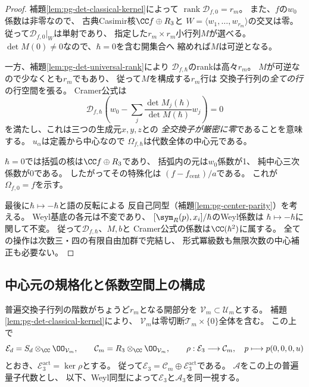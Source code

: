 \begin{proof}
補題\ref{lem:pg-det-classical-kernel}によって
$\operatorname{rank}\mathcal D_{f,0}=r_m$。
また、$f$の$w_0$係数は非零なので、
古典Casimir核$\CC f\oplus R_3$と
$W=\langle w_1,\ldots,w_{r_m}\rangle$の交叉は零。
従って$\mathcal D_{f,0}|_W$は単射であり、
指定した$r_m\times r_m$小行列$M$が選べる。
$\det M(0)\ne0$なので、$\hbar=0$を含む開集合へ
縮めれば$M$は可逆となる。

一方、補題\ref{lem:pg-det-universal-rank}により
$\mathcal D_{f,\hbar}$のrankは高々$r_m$。
$M$が可逆なので少なくとも$r_m$でもあり、
従って$M$を構成する$r_m$行は
交換子行列の\emph{全ての行}の行空間を張る。
Cramer公式は
\begin{equation}
 \mathcal D_{f,\hbar}
 \left(w_0-\sum_j\frac{\det M_j(\hbar)}{\det M(\hbar)}w_j\right)=0
 \label{eq:pg-det-cramer-kernel}
\end{equation}
を満たし、これは三つの生成元$x,y,z$との
\emph{全交換子が厳密に零}であることを意味する。
$u_\alpha$は定義から中心なので
$\Omega_{f,\hbar}$は代数全体の中心元である。

$\hbar=0$では括弧の核は$\CC f\oplus R_3$であり、
括弧内の元は$w_0$係数が1、
純中心三次係数が0である。
したがってその特殊化は
$(f-f_{\mathrm{cent}})/a$である。
これが$\Omega_{f,0}=f$を示す。

最後に$\hbar\mapsto-\hbar$と語の反転による
反自己同型（補題\ref{lem:pg-center-parity}）を考える。
Weyl基底の各元は不変であり、
$[\sym_R(p),x_i]/\hbar$のWeyl係数は
$\hbar\mapsto-\hbar$に関して不変。
従って$\mathcal D_{f,\hbar}$、$M,b$と
Cramer公式の係数は$\CC(\hbar^2)$に属する。
全ての操作は次数三・四の有限自由加群で完結し、
形式冪級数も無限次数の中心補正も必要ない。
\end{proof}

\subsection{中心元の規格化と係数空間上の構成}
\label{subsec:pg-det-center-family}
普遍交換子行列の階数がちょうど$r_m$となる開部分を
$\mathcal V_m\subset\mathcal U_m$とする。
補題\ref{lem:pg-det-classical-kernel}により、
$\mathcal V_m$は零切断$\mathcal T_m\times\{0\}$全体を含む。
この上で
\begin{equation}
 \mathcal E_d=S_d\otimes_\CC\OO_{\mathcal V_m},\qquad
 \mathcal C_m=R_3\otimes_\CC\OO_{\mathcal V_m},\qquad
 \rho:\mathcal E_3\longrightarrow\mathcal C_m,
 \quad p\longmapsto p(0,0,0,u)
 \label{eq:pg-det-degree-three-bundles}
\end{equation}
とおき、$\mathcal E_3^{\mathrm{act}}=\ker\rho$とする。
従って$\mathcal E_3=\mathcal C_m\oplus\mathcal E_3^{\mathrm{act}}$である。
$\mathcal A$をこの上の普遍量子代数とし、
以下、Weyl同型によって$\mathcal E_3$と$\mathcal A_3$を同一視する。

